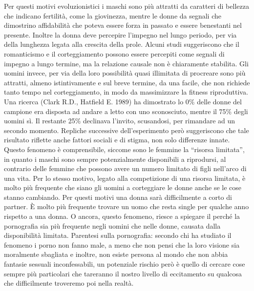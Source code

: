 \documentclass[12pt]{book} %
\begin{document}
Per questi motivi evoluzionistici i maschi sono più attratti da caratteri di bellezza che indicano fertilità, come la giovinezza, mentre le
donne da segnali che dimostrino affidabilità che poteva essere forza in passato e essere benestanti nel presente.
Inoltre la donna deve percepire l'impegno nel lungo periodo, per via della lunghezza legata
alla crescita della prole. Alcuni studi suggeriscono che il romanticismo e il corteggiamento possono essere percepiti come segnali di impegno a lungo termine, ma la relazione causale non è chiaramente stabilita. Gli uomini invece, per via della loro possibilità quasi
illimitata di procreare sono più attratti, almeno istintivamente e sul breve termine, da una facile, che non richiede
tanto tempo nel corteggiamento, in modo da massimizzare la fitness riproduttiva. Una ricerca (Clark R.D., Hatfield E.
1989) ha dimostrato lo 0\% delle donne del campione era disposta ad andare a letto con uno sconosciuto, mentre il 75\%
degli uomini sì. Il restante 25\% declinava l'invito, scusandosi, per rimandare ad un secondo
momento. Repliche successive dell'esperimento però suggeriscono che tale risultato riflette anche fattori sociali e di stigma, non solo differenze innate. Questo fenomeno è comprensibile, siccome sono le femmine la “risorsa limitata”, in quanto i maschi sono sempre
potenzialmente disponibili a riprodursi, al contrario delle femmine che possono avere un numero limitato di figli
nell'arco di una vita. Per lo stesso motivo, legato alla competizione di una risorsa limitata, è
molto più frequente che siano gli uomini a corteggiare le donne anche se le cose stanno cambiando. Per questi motivi
una donna sarà difficilmente a corto di partner. È molto più frequente trovare un uomo
che resta single per qualche anno rispetto a una donna. O ancora, questo fenomeno, riesce a spiegare il perché la
pornografia sia più frequente negli uomini che nelle donne, causata dalla disponibilità limitata. Parentesi
sulla pornografia: secondo chi ha studiato il fenomeno i porno non fanno male, a meno che non pensi che la loro visione
sia moralmente sbagliata e inoltre, non esiste
persona al mondo che non abbia fantasie sessuali inconfessabili, un potenziale rischio però è quello di cercare cose sempre più particolari che tareranno il nostro livello di eccitamento su qualcosa che difficilmente troveremo poi nella realtà. 
\end{document}
